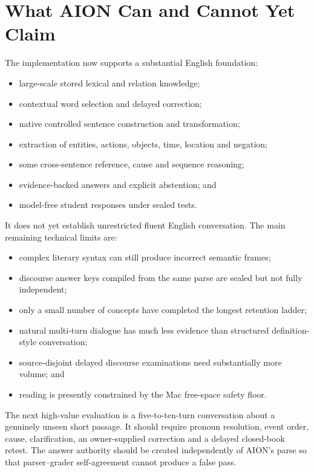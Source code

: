 \documentclass[11pt,a4paper]{article}
\begin{document}
\section{What AION Can and Cannot Yet Claim}

The implementation now supports a substantial English foundation:

\begin{itemize}
  \item large-scale stored lexical and relation knowledge;
  \item contextual word selection and delayed correction;
  \item native controlled sentence construction and transformation;
  \item extraction of entities, actions, objects, time, location and negation;
  \item some cross-sentence reference, cause and sequence reasoning;
  \item evidence-backed answers and explicit abstention; and
  \item model-free student responses under sealed tests.
\end{itemize}

It does not yet establish unrestricted fluent English conversation. The main remaining technical
limits are:

\begin{itemize}
  \item complex literary syntax can still produce incorrect semantic frames;
  \item discourse answer keys compiled from the same parse are sealed but not fully independent;
  \item only a small number of concepts have completed the longest retention ladder;
  \item natural multi-turn dialogue has much less evidence than structured definition-style
        conversation;
  \item source-disjoint delayed discourse examinations need substantially more volume; and
  \item reading is presently constrained by the Mac free-space safety floor.
\end{itemize}

The next high-value evaluation is a five-to-ten-turn conversation about a genuinely unseen short
passage. It should require pronoun resolution, event order, cause, clarification, an owner-supplied
correction and a delayed closed-book retest. The answer authority should be created independently
of AION's parse so that parser--grader self-agreement cannot produce a false pass.
\end{document}
